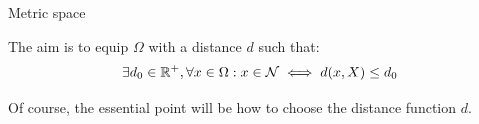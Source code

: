 \documentclass[xcolor=pdftex,dvipsnames,table,mathserif]{beamer}
\begin{document}
\begin{frame}{Metric space}

  The aim is to equip $\Omega$ with a distance $d$ such that:
  \[
  \exists d_0 \in \mathbb{R}^+,  \forall x \in \Omega: x \in \mathcal{N} \iff d(x, X) \leq d_0
  \]

  Of course, the essential point will be how to choose the distance function $d$.



\end{frame}



\end{document}
